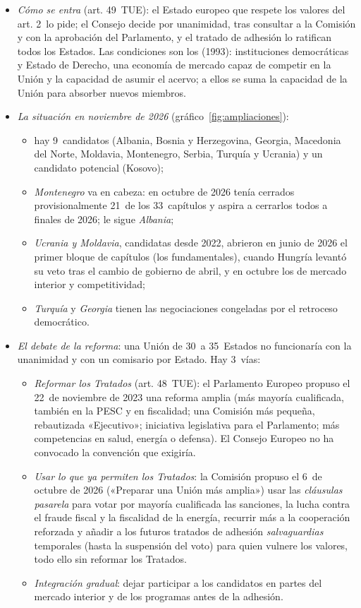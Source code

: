\documentclass[11pt]{article}
\begin{document}
\begin{itemize}
\item \emph{Cómo se entra} (art. 49~TUE): el Estado europeo que respete los valores del art. 2~lo pide; el Consejo decide por unanimidad, tras consultar a la Comisión y con la aprobación del Parlamento, y el tratado de adhesión lo ratifican todos los Estados. Las condiciones son los  (1993): instituciones democráticas y Estado de Derecho, una economía de mercado capaz de competir en la Unión y la capacidad de asumir el acervo; a ellos se suma la capacidad de la Unión para absorber nuevos miembros.
\item \emph{La situación en noviembre de 2026} (gráfico~\ref{fig:ampliaciones}):
  \begin{itemize}
  \item hay 9~candidatos (Albania, Bosnia y Herzegovina, Georgia, Macedonia del Norte, Moldavia, Montenegro, Serbia, Turquía y Ucrania) y un candidato potencial (Kosovo);
  \item \emph{Montenegro} va en cabeza: en octubre de 2026 tenía cerrados provisionalmente 21~de los 33~capítulos y aspira a cerrarlos todos a finales de 2026; le sigue \emph{Albania}\nocite{Consejo2026Conferencias};
  \item \emph{Ucrania y Moldavia}, candidatas desde 2022, abrieron en junio de 2026 el primer bloque de capítulos (los fundamentales), cuando Hungría levantó su veto tras el cambio de gobierno de abril, y en octubre los de mercado interior y competitividad;
  \item \emph{Turquía} y \emph{Georgia} tienen las negociaciones congeladas por el retroceso democrático.
  \end{itemize}
\item \emph{El debate de la reforma}: una Unión de 30~a 35~Estados no funcionaría con la unanimidad y con un comisario por Estado. Hay 3~vías:
  \begin{itemize}
  \item \emph{Reformar los Tratados} (art. 48~TUE): el Parlamento Europeo propuso el 22~de noviembre de 2023 una reforma amplia (más mayoría cualificada, también en la PESC y en fiscalidad; una Comisión más pequeña, rebautizada «Ejecutivo»; iniciativa legislativa para el Parlamento; más competencias en salud, energía o defensa)\nocite{PE2023Reforma}. El Consejo Europeo no ha convocado la convención que exigiría.
  \item \emph{Usar lo que ya permiten los Tratados}: la Comisión propuso el 6~de octubre de 2026 («Preparar una Unión más amplia») usar las \emph{cláusulas pasarela} para votar por mayoría cualificada las sanciones, la lucha contra el fraude fiscal y la fiscalidad de la energía, recurrir más a la cooperación reforzada y añadir a los futuros tratados de adhesión \emph{salvaguardias} temporales (hasta la suspensión del voto) para quien vulnere los valores, todo ello sin reformar los Tratados\nocite{CE2026Ampliada}.
  \item \emph{Integración gradual}: dejar participar a los candidatos en partes del mercado interior y de los programas antes de la adhesión.
  \end{itemize}
\end{itemize}
\end{document}

